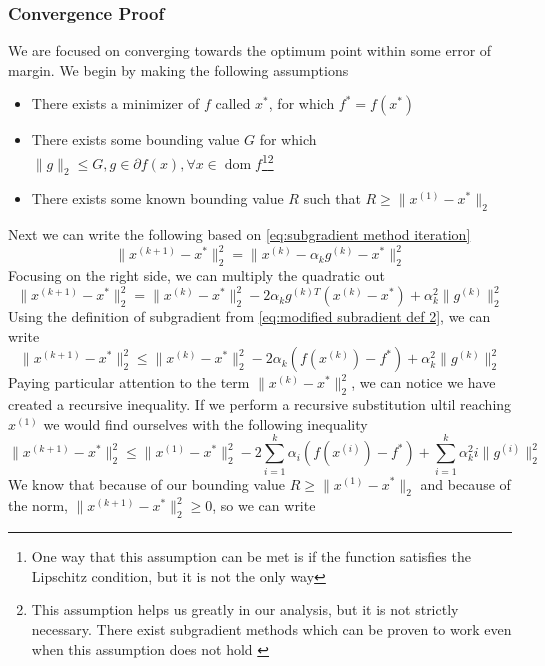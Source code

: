 \documentclass[journal,onecolumn]{IEEEtran}
\DeclareMathOperator{\dom}{dom}
\begin{document}
\subsubsection{Convergence Proof}
We are focused on converging towards the optimum point within some error of margin. We begin by making the following assumptions
\begin{itemize}
    \item There exists a minimizer of \(f\) called \(x^*\), for which \(f^* = f(x^*)\)
    \item There exists some bounding value \(G\) for which \(\|g\|_2 \leq G, g \in \partial f(x), \forall x \in \dom f\)\footnote{One way that this assumption can be met is if the function satisfies the Lipschitz condition, but it is not the only way}\footnote{This assumption helps us greatly in our analysis, but it is not strictly necessary. There exist subgradient methods which can be proven to work even when this assumption does not hold \cite{boydparksubgradients}}
    \item There exists some known bounding value \(R\) such that \(R \geq \|x^{(1)}-x^*\|_2\)
\end{itemize}
Next we can write the following based on \eqref{eq:subgradient method iteration}
\begin{equation}
\|x^{(k+1)}-x^*\|^2_2 = \|x^{(k)} - \alpha_k g^{(k)}-x^*\|^2_2
\end{equation}
Focusing on the right side, we can multiply the quadratic out
\begin{equation}
\|x^{(k+1)}-x^*\|^2_2= \|x^{(k)}-x^*\|^2_2 - 2\alpha_k g^{(k)T}(x^{(k)}-x^*) + \alpha^2_k \|g^{(k)}\|^2_2
\end{equation}
Using the definition of subgradient from \eqref{eq:modified subradient def 2}, we can write
\begin{equation}
\|x^{(k+1)}-x^*\|^2_2 \leq \|x^{(k)}-x^*\|^2_2 - 2\alpha_k (f(x^{(k)})-f^*) + \alpha^2_k \|g^{(k)}\|^2_2
\end{equation}
Paying particular attention to the term \(\|x^{(k)}-x^*\|^2_2\), we can notice we have created a recursive inequality. If we perform a recursive substitution ultil reaching \(x^{(1)}\) we would find ourselves with the following inequality
\begin{equation}
\|x^{(k+1)}-x^*\|^2_2 \leq \|x^{(1)}-x^*\|^2_2 - 2\sum^k_{i=1}\alpha_i (f(x^{(i)})-f^*) + \sum^k_{i=1}\alpha^2_ki\|g^{(i)}\|^2_2
\end{equation}
We know that because of our bounding value \(R \geq \|x^{(1)}-x^*\|_2\) and because of the norm, \(\|x^{(k+1)}-x^*\|^2_2 \geq 0\), so we can write
\end{document}
